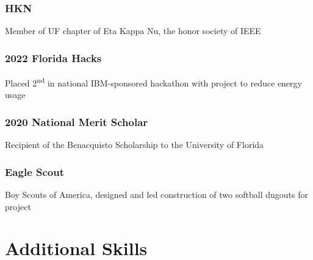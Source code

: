 \documentclass{article}
\newcommand{\sectionspacing}{\vspace{-0em}} %
\begin{document}
\subsubsection{HKN}
Member of UF chapter of Eta Kappa Nu, the honor society of IEEE

\subsubsection{2022 Florida Hacks}
Placed 2\textsuperscript{nd} in national IBM-sponsored hackathon with project to reduce energy usage


\subsubsection{2020 National Merit Scholar}
Recipient of the Benacquisto Scholarship to the University of Florida

\subsubsection{Eagle Scout}
Boy Scouts of America,
designed and led construction of two softball dugouts for project

\sectionspacing{}
\section{Additional Skills}
\end{document}
